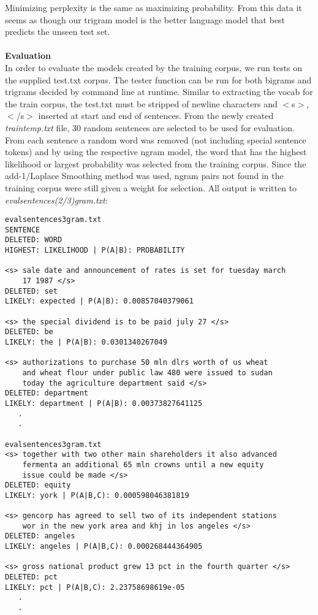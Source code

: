 \documentclass{article}
\begin{document}
Minimizing perplexity is the same as maximizing probability. From this data it seems as though our trigram model is the better language model that best predicts the unseen test set.
\\
\\
\textbf{Evaluation}\\
In order to evaluate the models created by the training corpus, we run tests on the supplied test.txt corpus. The tester function can be run for both bigrams and trigrams decided by command line at runtime. Similar to extracting the vocab for the train corpus, the test.txt must be stripped of newline characters and $<$s$>$, $<$/s$>$ inserted at start and end of sentences. From the newly created \textit{traintemp.txt} file, 30 random sentences are selected to be used for evaluation. From each sentence a random word was removed (not including special sentence tokens) and by using the respective ngram model, the word that has the highest likelihood or largest probability was selected from the training corpus. Since the add-1/Laplace Smoothing method was used, ngram pairs not found in the training corpus were still given a weight for selection. All output is written to \textit{evalsentences(2/3)gram.txt}:
\begin{verbatim}
evalsentences3gram.txt
SENTENCE
DELETED: WORD
HIGHEST: LIKELIHOOD | P(A|B): PROBABILITY

<s> sale date and announcement of rates is set for tuesday march 
    17 1987 </s>
DELETED: set
LIKELY: expected | P(A|B): 0.00857040379061

<s> the special dividend is to be paid july 27 </s>
DELETED: be
LIKELY: the | P(A|B): 0.0301340267049

<s> authorizations to purchase 50 mln dlrs worth of us wheat
    and wheat flour under public law 480 were issued to sudan
    today the agriculture department said </s>
DELETED: department
LIKELY: department | P(A|B): 0.00373827641125
   .
   .
   
evalsentences3gram.txt
<s> together with two other main shareholders it also advanced
    fermenta an additional 65 mln crowns until a new equity 
    issue could be made </s>
DELETED: equity
LIKELY: york | P(A|B,C): 0.000598046381819

<s> gencorp has agreed to sell two of its independent stations 
    wor in the new york area and khj in los angeles </s>
DELETED: angeles
LIKELY: angeles | P(A|B,C): 0.000268444364905

<s> gross national product grew 13 pct in the fourth quarter </s>
DELETED: pct
LIKELY: pct | P(A|B,C): 2.23758698619e-05
   .
   .
\end{verbatim}  
\end{document}
